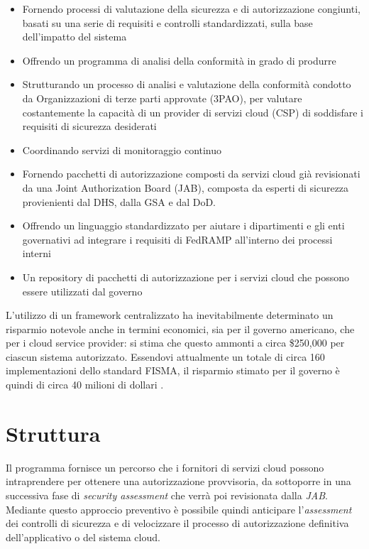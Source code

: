 \documentclass[../main.tex]{subfiles}
\begin{document}
\begin{itemize}
    \item Fornendo processi di valutazione della sicurezza e di autorizzazione congiunti, basati su una serie di requisiti e controlli standardizzati, sulla base dell'impatto del sistema 
    \item Offrendo un programma di analisi della conformità in grado di produrre %
    \item Strutturando un processo di analisi e valutazione della conformità condotto da Organizzazioni di terze parti approvate (3PAO), per valutare costantemente la capacità di un provider di servizi cloud (CSP) di soddisfare i requisiti di sicurezza desiderati
    \item Coordinando servizi di monitoraggio continuo
    \item Fornendo pacchetti di autorizzazione composti da servizi cloud già revisionati da una Joint Authorization Board (JAB), composta da esperti di sicurezza provienienti dal DHS, dalla GSA e dal DoD.
    \item Offrendo un linguaggio standardizzato per aiutare i dipartimenti e gli enti governativi ad integrare i requisiti di FedRAMP all'interno dei processi interni
    \item Un repository di pacchetti di autorizzazione per i servizi cloud che possono essere utilizzati dal governo %
\end{itemize}

L'utilizzo di un framework centralizzato ha inevitabilmente determinato un risparmio notevole anche in termini economici, sia per il governo americano, che per i cloud service provider: si stima che questo ammonti a circa \$250,000 per ciascun sistema autorizzato. Essendovi attualmente un totale di circa 160 implementazioni dello standard FISMA, il risparmio stimato per il governo è quindi di circa 40 milioni di dollari \cite{7036263}.
\section{Struttura}
Il programma fornisce un percorso che i fornitori di servizi cloud possono intraprendere per ottenere una autorizzazione provvisoria, da sottoporre in una successiva fase di \textit{security assessment} che verrà poi revisionata dalla \textit{JAB}.
Mediante questo approccio preventivo è possibile quindi anticipare l'\textit{assessment} dei controlli di sicurezza e di velocizzare il processo di autorizzazione definitiva dell'applicativo o del sistema cloud.
\end{document}

